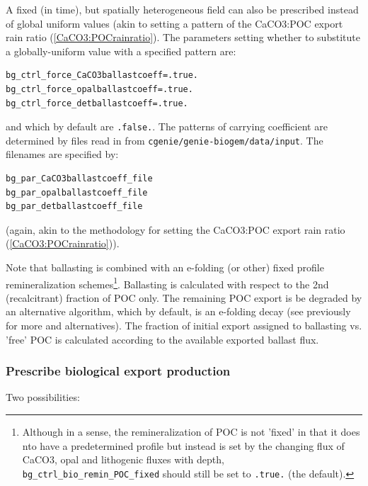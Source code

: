 \documentclass[11pt,fleqn]{book} %
\begin{document}
A fixed (in time), but spatially heterogeneous field can also be prescribed instead of global uniform values (akin to setting a pattern of the CaCO3:POC export rain ratio (\ref{CaCO3:POCrainratio}). The parameters setting whether to substitute a globally-uniform value with a specified pattern are:
\vspace{-2pt}\begin{verbatim}
bg_ctrl_force_CaCO3ballastcoeff=.true.
bg_ctrl_force_opalballastcoeff=.true.
bg_ctrl_force_detballastcoeff=.true.
\end{verbatim}\vspace{-2pt}
and which by default are \texttt{.false.}.
The patterns of carrying coefficient are determined by files read in from \texttt{cgenie\slash genie-biogem\slash data\slash input}. The filenames are specified by:
\vspace{-2pt}\begin{verbatim}
bg_par_CaCO3ballastcoeff_file
bg_par_opalballastcoeff_file
bg_par_detballastcoeff_file
\end{verbatim}\vspace{-2pt}
(again, akin to the methodology for setting the CaCO3:POC export rain ratio (\ref{CaCO3:POCrainratio})).

Note that ballasting is combined with an e-folding (or other) fixed profile remineralization schemes\footnote{Although in a sense, the remineralization of POC is not 'fixed' in that it does nto have a predetermined profile but instead is set by the changing flux of CaCO3, opal and lithogenic fluxes with depth, \texttt{bg\_ctrl\_bio\_remin\_POC\_fixed} should still be set to \texttt{.true.} (the default).}. Ballasting is calculated with respect to the 2nd (recalcitrant) fraction of POC only. The remaining POC export is be degraded by an alternative algorithm, which by default, is an e-folding decay (see previously for more and alternatives). The fraction of initial export assigned to ballasting vs. 'free' POC is calculated according to the available exported ballast flux.

%
\subsubsection{Prescribe biological export production}
\vspace{1mm}

Two possibilities:
\end{document}
